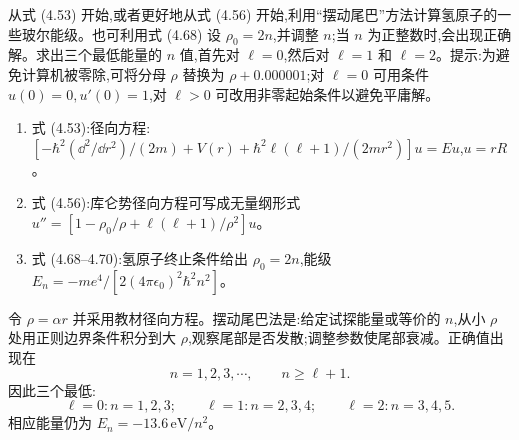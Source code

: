 \begin{question}
从式 (4.53) 开始,或者更好地从式 (4.56) 开始,利用“摆动尾巴”方法计算氢原子的一些玻尔能级。也可利用式 (4.68) 设 $\rho_0=2n$,并调整 $n$;当 $n$ 为正整数时,会出现正确解。求出三个最低能量的 $n$ 值,首先对 $\ell=0$,然后对 $\ell=1$ 和 $\ell=2$。提示:为避免计算机被零除,可将分母 $\rho$ 替换为 $\rho+0.000001$;对 $\ell=0$ 可用条件 $u(0)=0,u'(0)=1$,对 $\ell>0$ 可改用非零起始条件以避免平庸解。

\par\smallskip
{}
\begin{enumerate}[leftmargin=2.2em,itemsep=0.12em,topsep=0.12em,parsep=0pt]
\item 式 (4.53):径向方程:$[-\hbar^2(\dd^2/\dd r^2)/(2m)+V(r)+\hbar^2\ell(\ell+1)/(2mr^2)]u=Eu$,$u=rR$。
\item 式 (4.56):库仑势径向方程可写成无量纲形式 $u''=[1-\rho_0/\rho+\ell(\ell+1)/\rho^2]u$。
\item 式 (4.68--4.70):氢原子终止条件给出 $\rho_0=2n$,能级 $E_n=-me^4/[2(4\pi\epsilon_0)^2\hbar^2n^2]$。
\end{enumerate}

\begin{solution}

令 $\rho=\alpha r$ 并采用教材径向方程。摆动尾巴法是:给定试探能量或等价的 $n$,从小 $\rho$ 处用正则边界条件积分到大 $\rho$,观察尾部是否发散;调整参数使尾部衰减。正确值出现在
\[
n=1,2,3,\cdots,
\qquad n\ge\ell+1.
\]
因此三个最低:
\[
\ell=0: n=1,2,3;
\qquad
\ell=1: n=2,3,4;
\qquad
\ell=2: n=3,4,5.
\]
相应能量仍为 $E_n=-13.6\,\mathrm{eV}/n^2$。

\end{solution}
\end{question}

